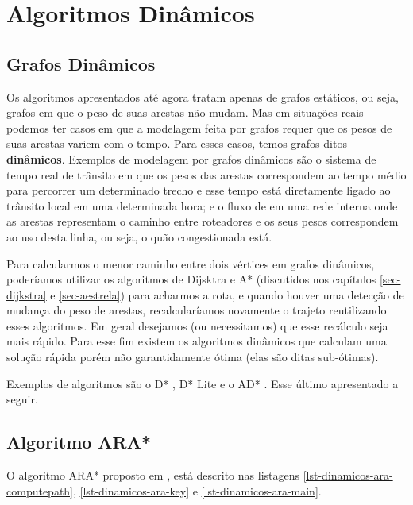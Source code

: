 \chapter{Algoritmos Dinâmicos}
\label{sec-dinamicos}

\section{Grafos Dinâmicos}
\label{sec-dinamicos-grafos}
Os algoritmos apresentados até agora tratam apenas de grafos estáticos, ou seja, grafos em que o peso de suas arestas não mudam. Mas em situações reais podemos ter casos em que a modelagem feita por grafos requer que os pesos de suas arestas variem com o tempo. Para esses casos, temos grafos ditos \textbf{dinâmicos}. Exemplos de modelagem por grafos dinâmicos são o sistema de tempo real de trânsito em que os pesos das arestas correspondem ao tempo médio para percorrer um determinado trecho e esse tempo está diretamente ligado ao trânsito local em uma determinada hora; e o fluxo de em uma rede interna onde as arestas representam o caminho entre roteadores e os seus pesos correspondem ao uso desta linha, ou seja, o quão congestionada está.

Para calcularmos o menor caminho entre dois vértices em grafos dinâmicos, poderíamos utilizar os algoritmos de Dijsktra e A* (discutidos nos capítulos \ref{sec-dijkstra} e \ref{sec-aestrela})  para acharmos a rota, e quando houver uma detecção de mudança do peso de arestas, recalcularíamos novamente o trajeto reutilizando esses algoritmos. Em geral desejamos (ou necessitamos) que esse recálculo seja mais rápido. Para esse fim existem os algoritmos dinâmicos que calculam uma solução rápida porém não garantidamente ótima (elas são ditas sub-ótimas).

Exemplos de algoritmos são o D* \cite{stentz1994optimal}, D* Lite \cite{koenig2002d} e o AD* \cite{likhachev2008anytime}. Esse último apresentado a seguir.
\section{Algoritmo ARA*}
\label{sec-dinamicos-ara}

O algoritmo ARA* proposto em , está descrito nas listagens \ref{lst-dinamicos-ara-computepath}, \ref{lst-dinamicos-ara-key} e \ref{lst-dinamicos-ara-main}.

